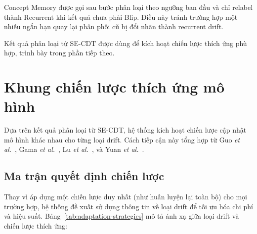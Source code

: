 Concept Memory được gọi sau bước phân loại theo ngưỡng ban đầu và chỉ relabel thành Recurrent khi kết quả chưa phải Blip. Điều này tránh trường hợp một nhiễu ngắn hạn quay lại phân phối cũ bị đổi nhãn thành recurrent drift.

Kết quả phân loại từ SE-CDT được dùng để kích hoạt chiến lược thích ứng phù hợp, trình bày trong phần tiếp theo.

\section{Khung chiến lược thích ứng mô hình}
\label{sec:model-adaptation-framework}


Dựa trên kết quả phân loại từ SE-CDT, hệ thống kích hoạt chiến lược cập nhật mô hình khác nhau cho từng loại drift. Cách tiếp cận này tổng hợp từ Guo \textit{et al.}~\cite{guo2022cdtmsw}, Gama \textit{et al.}~\cite{gama2014survey}, Lu \textit{et al.}~\cite{lu2018learning}, và Yuan \textit{et al.}~\cite{yuan2022advances}.

\subsection{Ma trận quyết định chiến lược}

Thay vì áp dụng một chiến lược duy nhất (như huấn luyện lại toàn bộ) cho mọi trường hợp, hệ thống đề xuất sử dụng thông tin về loại drift để tối ưu hóa chi phí và hiệu suất. Bảng~\ref{tab:adaptation-strategies} mô tả ánh xạ giữa loại drift và chiến lược thích ứng:

